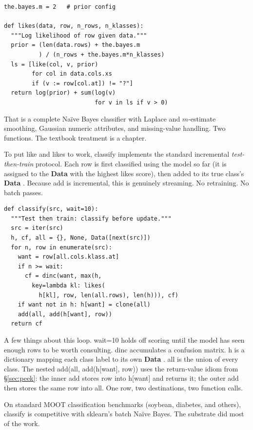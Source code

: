 \documentclass[AMA,STIX2COL]{WileyNJDv5}
\newcommand{\cls}[1]{%
  \setlength{\fboxsep}{1.5pt}%
  \colorbox{clsbg}{\sffamily\bfseries{#1}}%
}
\begin{document}
\begin{verbatim}
the.bayes.m = 2   # prior config

def likes(data, row, n_rows, n_klasses):
  """Log likelihood of row given data."""
  prior = (len(data.rows) + the.bayes.m
          ) / (n_rows + the.bayes.m*n_klasses)
  ls = [like(col, v, prior)
        for col in data.cols.xs
        if (v := row[col.at]) != "?"]
  return log(prior) + sum(log(v)
                          for v in ls if v > 0)
\end{verbatim}

That is a complete Naïve Bayes classifier with Laplace and
$m$-estimate smoothing, Gaussian numeric attributes, and
missing-value handling. Two functions. The textbook treatment
is a chapter.

To put \textsf{like} and \textsf{likes} to work, \textsf{classify}
implements the standard incremental {\em test-then-train}
protocol. Each row is first classified using the model so far
(it is assigned to the \cls{Data} with the highest
\textsf{likes} score), then added to its true class's
\cls{Data}. Because \textsf{add} is incremental, this is
genuinely streaming. No retraining. No batch passes.

\begin{verbatim}
def classify(src, wait=10):
  """Test then train: classify before update."""
  src = iter(src)
  h, cf, all = {}, None, Data([next(src)])
  for n, row in enumerate(src):
    want = row[all.cols.klass.at]
    if n >= wait:
      cf = dinc(want, max(h,
        key=lambda kl: likes(
          h[kl], row, len(all.rows), len(h))), cf)
    if want not in h: h[want] = clone(all)
    add(all, add(h[want], row))
  return cf
\end{verbatim}

A few things about this loop. \textsf{wait=10} holds off scoring
until the model has seen enough rows to be worth consulting.
\textsf{dinc} accumulates a confusion matrix. \textsf{h} is a
dictionary mapping each class label to its own \cls{Data}.
\textsf{all} is the union of every class. The nested
\textsf{add(all, add(h[want], row))} uses the return-value
idiom from \S\ref{sec:peek}: the inner \textsf{add} stores
\textsf{row} into \textsf{h[want]} and returns it; the outer
\textsf{add} then stores the same row into \textsf{all}. One
row, two destinations, two function calls.

On standard MOOT classification benchmarks (soybean, diabetes,
and others), \textsf{classify} is competitive with sklearn's
batch Naïve Bayes. The substrate did most of the work.
\end{document}

